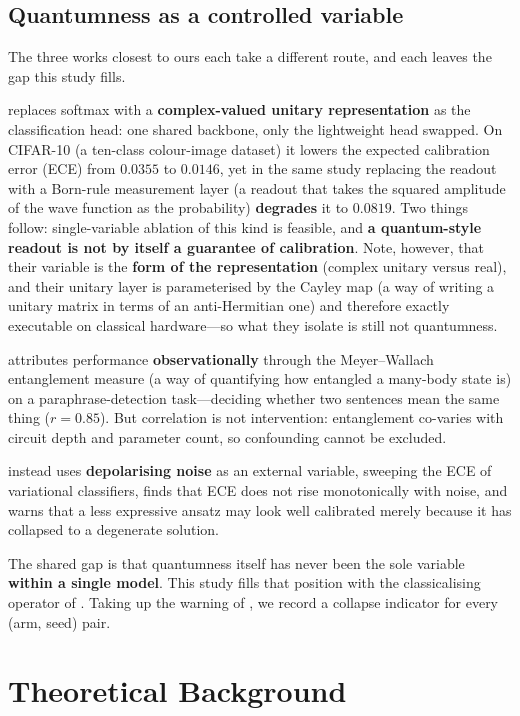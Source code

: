 \documentclass{article}
\begin{document}
\subsection{Quantumness as a controlled variable}

The three works closest to ours each take a different route, and each
leaves the gap this study fills.

\cite{jafari2026} replaces softmax with a \textbf{complex-valued unitary
representation} as the classification head: one shared backbone, only
the lightweight head swapped. On CIFAR-10 (a ten-class colour-image
dataset) it lowers the expected calibration error (ECE) from \(0.0355\)
to \(0.0146\), yet in the same study replacing the readout with a
Born-rule measurement layer (a readout that takes the squared amplitude
of the wave function as the probability) \textbf{degrades} it to
\(0.0819\). Two things follow: single-variable ablation of this kind is
feasible, and \textbf{a quantum-style readout is not by itself a
guarantee of calibration}. Note, however, that their variable is the
\textbf{form of the representation} (complex unitary versus real), and
their unitary layer is parameterised by the Cayley map (a way of writing
a unitary matrix in terms of an anti-Hermitian one) and therefore
exactly executable on classical hardware---so what they isolate is still
not quantumness.

\cite{nausheen2026} attributes performance \textbf{observationally}
through the Meyer--Wallach entanglement measure (a way of quantifying
how entangled a many-body state is) on a paraphrase-detection
task---deciding whether two sentences mean the same thing
(\(r = 0.85\)). But correlation is not intervention: entanglement
co-varies with circuit depth and parameter count, so confounding cannot
be excluded.

\cite{ghosh2026} instead uses \textbf{depolarising noise} as an external
variable, sweeping the ECE of variational classifiers, finds that ECE
does not rise monotonically with noise, and warns that a less expressive
ansatz may look well calibrated merely because it has collapsed to a
degenerate solution.

The shared gap is that quantumness itself has never been the sole
variable \textbf{within a single model}. This study fills that position
with the classicalising operator of \cite{tucci2012}. Taking up the
warning of \cite{ghosh2026}, we record a collapse indicator for every
(arm, seed) pair.

\section{Theoretical Background}
\end{document}
